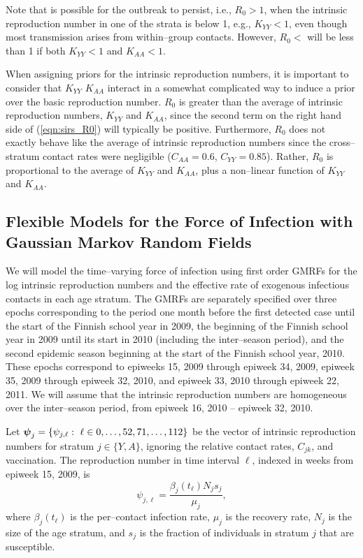 Note that is possible for the outbreak to persist, i.e., $ R_0 > 1 $,  when the intrinsic reproduction number in one of the strata is below 1, e.g., $ K_{YY} <1$, even though most transmission arises from within--group contacts. However, $ R_0 <$ will be less than 1 if both $ K_{YY} <1 $ and $ K_{AA} <1 $.

When assigning priors for the intrinsic reproduction numbers, it is important to consider that  $ K_{YY} $ $ K_{AA} $ interact in a somewhat complicated way to induce a prior over the basic reproduction number. $ R_0 $  is greater than the average of intrinsic reproduction numbers, $ K_{YY} $ and $ K_{AA} $, since the second term on the right hand side of (\ref{eqn:sirs_R0}) will typically be positive. Furthermore, $ R_0 $ does not exactly behave like the average of intrinsic reproduction numbers since the cross--stratum contact rates were negligible ($ C_{AA} = 0.6 $, $ C_{YY}=0.85 $). Rather, $ R_0 $ is proportional to the average of $ K_{YY} $ and $ K_{AA} $, plus a non--linear function of $ K_{YY} $ and $ K_{AA} $. 

\subsection{Flexible Models for the Force of Infection with Gaussian Markov Random Fields}
\label{subsec:flu_gmrf}

We will model the time--varying force of infection using first order GMRFs for the log intrinsic reproduction numbers and the effective rate of exogenous infectious contacts in each age stratum. The GMRFs are separately specified over three epochs corresponding to the period one month before the first detected case until the start of the Finnish school year in 2009, the beginning of the Finnish school year in 2009 until its start in 2010 (including the inter--season period), and the second epidemic season beginning at the start of the Finnish school year, 2010. These epochs correspond to epiweeks 15, 2009 through epiweek 34, 2009, epiweek 35, 2009 through epiweek 32, 2010, and epiweek 33, 2010 through epiweek 22, 2011. We will assume that the intrinsic reproduction numbers are homogeneous over the inter--season period, from epiweek 16, 2010 -- epiweek 32, 2010.

Let $ \bpsi_{j} = \lbrace\psi_{j,\ell}:\ \ell \in 0,\dots,52,71,\dots,112\rbrace $ be the vector of intrinsic reproduction numbers for stratum $ j \in \lbrace Y,A \rbrace$, ignoring the relative contact rates, $ C_{jk} $, and vaccination. The reproduction number in time interval $ \ell $, indexed in weeks from epiweek 15, 2009, is
\begin{equation}
\label{eqn:R0t_novacc}
\psi_{j,\ell} = \frac{\beta_j(t_\ell)N_js_j}{\mu_j},
\end{equation}
where $ \beta_j(t_\ell) $ is the per--contact infection rate, $ \mu_j $ is the recovery rate, $ N_j $ is the size of the age stratum, and $ s_j $ is the fraction of individuals in stratum $ j $ that are susceptible.
 
